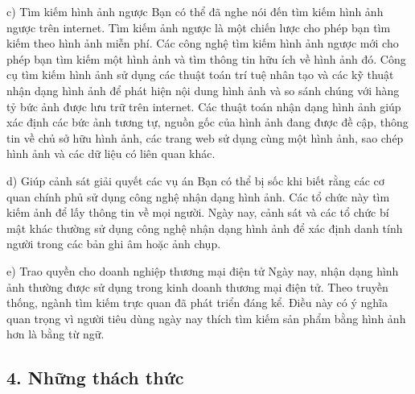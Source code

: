 \documentclass[../main.tex]{subfiles}
\begin{document}
c) Tìm kiếm hình ảnh ngược
Bạn có thể đã nghe nói đến tìm kiếm hình ảnh ngược trên internet. Tìm kiếm ảnh ngược là một chiến lược cho phép bạn tìm kiếm theo hình ảnh miễn phí. Các công nghệ tìm kiếm hình ảnh ngược mới cho phép bạn tìm kiếm một hình ảnh và tìm thông tin hữu ích về hình ảnh đó. Công cụ tìm kiếm hình ảnh sử dụng các thuật toán trí tuệ nhân tạo và các kỹ thuật nhận dạng hình ảnh để phát hiện nội dung hình ảnh và so sánh chúng với hàng tỷ bức ảnh được lưu trữ trên internet. Các thuật toán nhận dạng hình ảnh giúp xác định các bức ảnh tương tự, nguồn gốc của hình ảnh đang được đề cập, thông tin về chủ sở hữu hình ảnh, các trang web sử dụng cùng một hình ảnh, sao chép hình ảnh và các dữ liệu có liên quan khác.

d) Giúp cảnh sát giải quyết các vụ án
Bạn có thể bị sốc khi biết rằng các cơ quan chính phủ sử dụng công nghệ nhận dạng hình ảnh. Các tổ chức này tìm kiếm ảnh để lấy thông tin về mọi người. Ngày nay, cảnh sát và các tổ chức bí mật khác thường sử dụng công nghệ nhận dạng hình ảnh để xác định danh tính người trong các bản ghi âm hoặc ảnh chụp.

e) Trao quyền cho doanh nghiệp thương mại điện tử
Ngày nay, nhận dạng hình ảnh thường được sử dụng trong kinh doanh thương mại điện tử. Theo truyền thống, ngành tìm kiếm trực quan đã phát triển đáng kể. Điều này có ý nghĩa quan trọng vì người tiêu dùng ngày nay thích tìm kiếm sản phẩm bằng hình ảnh hơn là bằng từ ngữ.

\subsection*{4. Những thách thức}
\end{document}
